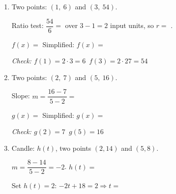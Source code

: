 \documentclass[10pt]{article}
\begin{document}
\vspace{0.08in}

\begin{tcolorbox}[colback=white, colframe=black!40,
    title=\textbf{Tier A --- Apply (Key)},
    fonttitle=\bfseries, arc=2mm, left=3mm, right=3mm, top=2mm, bottom=2mm]

\begin{enumerate}[itemsep=10pt]
  \item Two points: $(1,\ 6)$ and $(3,\ 54)$.

        Ratio test: $\dfrac{54}{6} = $  over $3 - 1 = 2$ input units,
        so $r = $ .

        $f(x) = $  \quad Simplified: $f(x) = $ 

        \textit{Check: $f(1) = 2 \cdot 3 = 6$\ \checkmark\quad $f(3) = 2 \cdot 27 = 54$\ \checkmark}

  \item Two points: $(2,\ 7)$ and $(5,\ 16)$.

        Slope: $m = \dfrac{16 - 7}{5 - 2} = $ 

        $g(x) = $  \quad Simplified: $g(x) = $ 

        \textit{Check: $g(2) = 7$\ \checkmark\quad $g(5) = 16$\ \checkmark}

  \item Candle: $h(t)$, two points $(2, 14)$ and $(5, 8)$.

        $m = \dfrac{8 - 14}{5 - 2} = -2$. \quad $h(t) = $ 

        Set $h(t) = 2$: $-2t + 18 = 2 \Rightarrow t = $ 
\end{enumerate}
\end{tcolorbox}

\vspace{0.08in}
\end{document}
